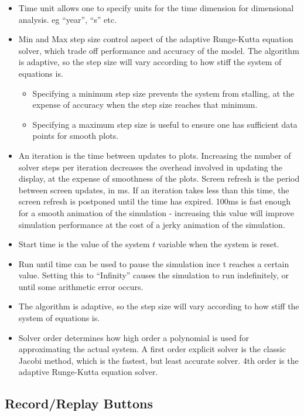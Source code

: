 \begin{itemize}
\item Time unit allows one to specify units for the time dimension for dimensional
analysis. eg ``year'', ``s'' etc. 
\item Min and Max step size control aspect of the adaptive Runge-Kutta equation
solver, which trade off performance and accuracy of the model. The
algorithm is adaptive, so the step size will vary according to how
stiff the system of equations is. 
\begin{itemize}
\item Specifying a minimum step size prevents the system from stalling,
at the expense of accuracy when the step size reaches that minimum. 
\item Specifying a maximum step size is useful to ensure one has sufficient
data points for smooth plots. 
\end{itemize}
\item An iteration is the time between updates to plots. Increasing the
number of solver steps per iteration decreases the overhead involved
in updating the display, at the expense of smoothness of the plots.
Screen refresh is the period between screen updates, in ms. If an
iteration takes less than this time, the screen refresh is postponed
until the time has expired. 100ms is fast enough for a smooth animation
of the simulation - increasing this value will improve simulation
performance at the cost of a jerky animation of the simulation. 
\item Start time is the value of the system $t$ variable when the system
is reset. 
\item Run until time can be used to pause the simulation ince t reaches
a certain value. Setting this to ``Infinity'' causes the simulation
to run indefinitely, or until some arithmetic error occurs. 
\item The algorithm is adaptive, so the step size will vary according to
how stiff the system of equations is. 
\item Solver order determines how high order a polynomial is used for approximating
the actual system. A first order explicit solver is the classic Jacobi
method, which is the fastest, but least accurate solver. 4th order
is the adaptive Runge-Kutta equation solver.
\end{itemize}

\subsection{Record/Replay Buttons}

